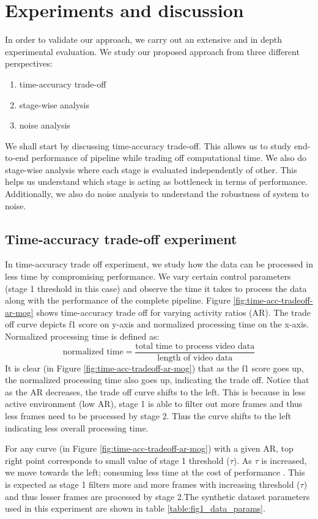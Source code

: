 \section{Experiments and discussion}
In order to validate our approach, we carry out an extensive and in depth experimental evaluation.  We study our proposed approach from three different perspectives: 

\begin{enumerate}
\item time-accuracy trade-off
\item stage-wise analysis
\item noise analysis
\end{enumerate}

We shall start by discussing time-accuracy trade-off. This allows us to study end-to-end performance of pipeline while trading off computational time.  We also do stage-wise analysis where each stage is evaluated independently of other. This helps us understand which stage is acting as bottleneck in terms of performance. Additionally, we also do noise analysis to understand the robustness of system to noise.

\subsection{Time-accuracy trade-off experiment}
In time-accuracy trade off experiment, we study how the data can be processed in less time by compromising performance. We vary certain control parameters (stage 1 threshold in this case) and observe the time it takes to process the data along with the performance of the complete pipeline. Figure \ref{fig:time-acc-tradeoff-ar-mog} shows time-accuracy trade off for varying activity ratios (AR). The trade off curve depicts f1 score on y-axis and normalized processing time on the x-axis. Normalized processing time is defined as: 
$$\text{normalized time} = \frac{\text{total time to process video data}}{\text{length of video data}}$$
It is clear (in Figure \ref{fig:time-acc-tradeoff-ar-mog}) that as the f1 score goes up, the normalized processing time also goes up, indicating the trade off. Notice that as the AR decreases, the trade off curve shifts to the left. This is because in less active environment (low AR), stage 1 is able to filter out more frames and thus less frames need to be processed by stage 2. Thus the curve shifts to the left indicating less overall processing time.   

For any curve (in Figure \ref{fig:time-acc-tradeoff-ar-mog}) with a given AR, top right point corresponds to small value of stage 1 threshold ($\tau$). As $\tau$ is increased, we move towards the left; consuming less time at the cost of performance . This is expected as stage 1 filters more and more frames with increasing threshold ($\tau$) and thus lesser frames are processed by stage 2.The synthetic dataset parameters used in this experiment are shown in table \ref{table:fig1_data_params}. 

